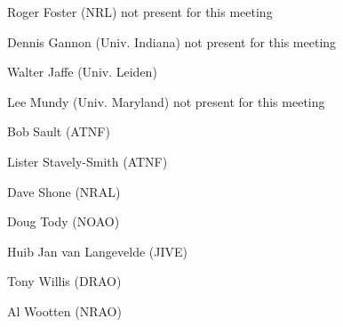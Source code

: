 Roger Foster (NRL) not present for this meeting

Dennis Gannon (Univ. Indiana) not present for this meeting

Walter Jaffe (Univ. Leiden)

Lee Mundy (Univ. Maryland) not present for this meeting

Bob Sault (ATNF)

Lister Stavely-Smith (ATNF)

Dave Shone (NRAL)

Doug Tody (NOAO)

Huib Jan van Langevelde (JIVE)

Tony Willis (DRAO)

Al Wootten (NRAO)

